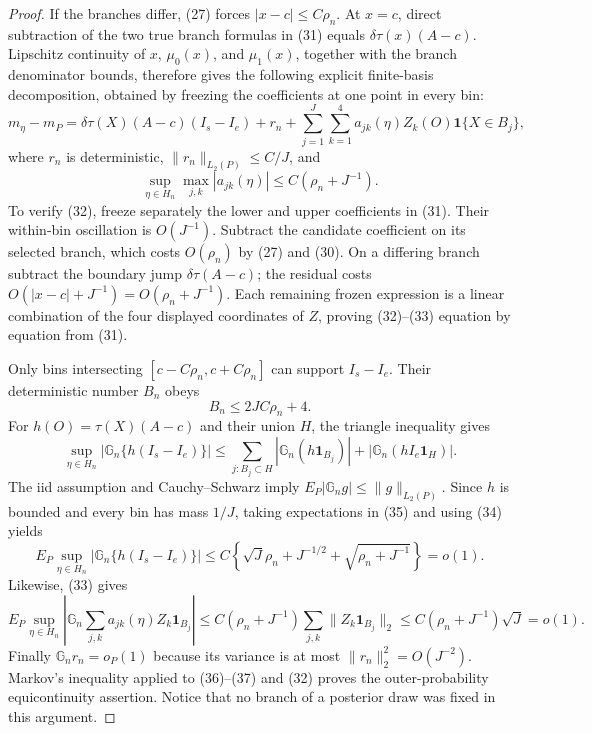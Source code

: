 \documentclass{article}
\begin{document}
\begin{proof}
If the branches differ, (27) forces \(|x-c|\le C\rho_n\).  At \(x=c\), direct subtraction of the two true branch formulas in (31) equals
\(\delta\tau(x)(A-c)\).  Lipschitz continuity of \(x\), \(\mu_0(x)\), and \(\mu_1(x)\), together with the branch denominator bounds, therefore gives the following explicit finite-basis decomposition, obtained by freezing the coefficients at one point in every bin:
\begin{equation}
 m_\eta-m_P
 =\delta\tau(X)(A-c)(I_s-I_e)+r_n+
   \sum_{j=1}^J\sum_{k=1}^4 a_{jk}(\eta)Z_k(O)\mathbf1\{X\in B_j\},                    \tag{32}
\end{equation}
where \(r_n\) is deterministic, \(\|r_n\|_{L_2(P)}\le C/J\), and
\begin{equation}
 \sup_{\eta\in H_n}\max_{j,k}|a_{jk}(\eta)|\le C(\rho_n+J^{-1}).                      \tag{33}
\end{equation}
To verify (32), freeze separately the lower and upper coefficients in (31).  Their within-bin oscillation is \(O(J^{-1})\).  Subtract the candidate coefficient on its selected branch, which costs \(O(\rho_n)\) by (27) and (30).  On a differing branch subtract the boundary jump \(\delta\tau(A-c)\); the residual costs \(O(|x-c|+J^{-1})=O(\rho_n+J^{-1})\).  Each remaining frozen expression is a linear combination of the four displayed coordinates of \(Z\), proving (32)--(33) equation by equation from (31).

Only bins intersecting \([c-C\rho_n,c+C\rho_n]\) can support \(I_s-I_e\).  Their deterministic number \(B_n\) obeys
\begin{equation}
 B_n\le2JC\rho_n+4.                                                                      \tag{34}
\end{equation}
For \(h(O)=\tau(X)(A-c)\) and their union \(H\), the triangle inequality gives
\begin{equation}
 \sup_{\eta\in H_n}|\mathbb G_n\{h(I_s-I_e)\}|
 \le\sum_{j:B_j\subset H}|\mathbb G_n(h\mathbf1_{B_j})|
     +|\mathbb G_n(hI_e\mathbf1_H)|.                                                     \tag{35}
\end{equation}
The iid assumption and Cauchy--Schwarz imply
\(E_P|\mathbb G_ng|\le\|g\|_{L_2(P)}\).  Since \(h\) is bounded and every bin has mass \(1/J\), taking expectations in (35) and using (34) yields
\begin{equation}
 E_P\sup_{\eta\in H_n}|\mathbb G_n\{h(I_s-I_e)\}|
 \le C\left\{\sqrt J\rho_n+J^{-1/2}+\sqrt{\rho_n+J^{-1}}\right\}=o(1).               \tag{36}
\end{equation}
Likewise, (33) gives
\begin{equation}
 E_P\sup_{\eta\in H_n}\left|
 \mathbb G_n\sum_{j,k}a_{jk}(\eta)Z_k\mathbf1_{B_j}\right|
 \le C(\rho_n+J^{-1})\sum_{j,k}\|Z_k\mathbf1_{B_j}\|_2
 \le C(\rho_n+J^{-1})\sqrt J=o(1).                                                      \tag{37}
\end{equation}
Finally \(\mathbb G_nr_n=o_P(1)\) because its variance is at most
\(\|r_n\|_2^2=O(J^{-2})\).  Markov's inequality applied to (36)--(37) and (32) proves the outer-probability equicontinuity assertion.  Notice that no branch of a posterior draw was fixed in this argument.


\end{proof}
\end{document}
